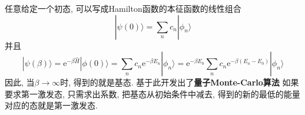        任意给定一个初态, 可以写成Hamilton函数的本征函数的线性组合
        \begin{equation}
            |\psi(0) \rangle = \sum_n c_n |\phi_n\rangle
        \end{equation}
        并且
        \begin{equation}
            |\psi(\beta) \rangle = \mathrm{e}^{-\beta \hat{H}} |\phi(0) \rangle = \sum_n c_n\mathrm{e}^{-\beta E_n}|\phi_n \rangle = \mathrm{e}^{-\beta E_0} \sum_n c_n \mathrm{e}^{-\beta(E_n-E_0)} |\phi_n \rangle
        \end{equation}
        因此, 当$\beta \to \infty$时, 得到的就是基态. 基于此开发出了\textbf{量子Monte-Carlo算法}
        如果要求第一激发态, 只需求出系数, 把基态从初始条件中减去, 得到的新的最低的能量对应的态就是第一激发态. 

    
    